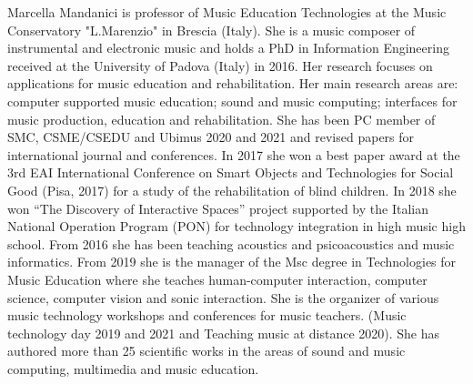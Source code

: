 \documentclass[journal]{IEEEtran}
\begin{document}
% 
\begin{IEEEbiography}{Marcella Mandanici} is professor of Music Education Technologies at the Music Conservatory "L.Marenzio" in Brescia (Italy). She is a music composer of instrumental and electronic music and holds a PhD in Information Engineering received at the University of Padova (Italy) in 2016. Her research focuses on applications for music education and rehabilitation. 
Her main research areas are: computer supported music education; sound and music computing; interfaces for music production, education and rehabilitation. She has been PC member of SMC, CSME/CSEDU and Ubimus 2020 and 2021 and revised papers for international journal and conferences. In 2017 she won a best paper award at the 3rd EAI International Conference on Smart Objects and Technologies for Social Good (Pisa, 2017) for a study of the rehabilitation of blind children. In 2018 she won “The Discovery of Interactive Spaces” project supported by the Italian National Operation Program (PON) for technology integration in high music high school. From 2016 she has been teaching acoustics and psicoacoustics and music informatics. From 2019 she is the manager of the Msc degree in Technologies for Music Education where she teaches human-computer interaction, computer science, computer vision and sonic interaction. She is the organizer of various music technology workshops and conferences for music teachers. (Music technology day 2019 and 2021 and Teaching music at distance 2020). She has authored more than 25 scientific works in the areas of sound and music computing, multimedia and music education.
\end{IEEEbiography}
\end{document}
